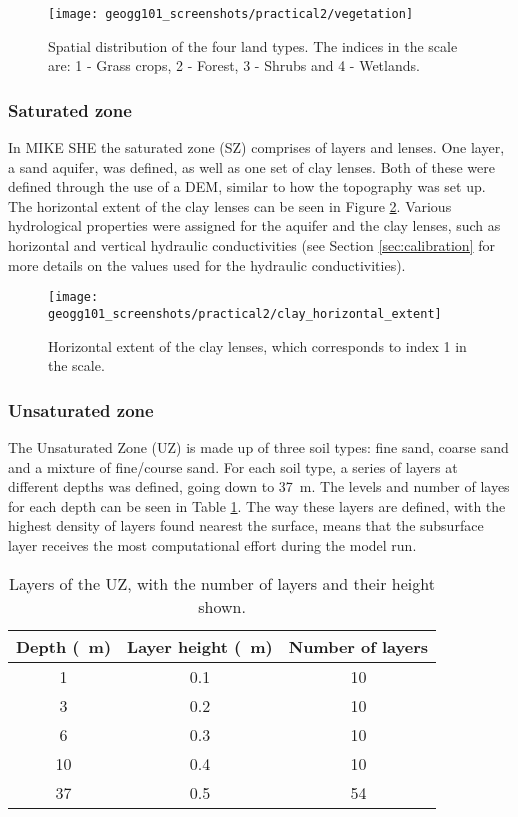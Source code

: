 \documentclass{article}
\begin{document}
\begin{figure}[!h]
    \centering
    \texttt{[image: geogg101\_screenshots/practical2/vegetation]}
    \caption{Spatial distribution of the four land types. The indices in the scale are: 1 - Grass crops, 2 - Forest, 3 - Shrubs and 4 - Wetlands. }
    \label{fig:vegetation}
\end{figure}


\subsubsection{Saturated zone}

In MIKE SHE the saturated zone (SZ) comprises of layers and lenses. One layer, a sand aquifer, was defined, as well as one set of clay lenses. Both of these were defined through the use of a DEM, similar to how the topography was set up. The horizontal extent of the clay lenses can be seen in Figure \ref{fig:clay_horizontal_extent}. Various hydrological properties were assigned for the aquifer and the clay lenses, such as horizontal and vertical hydraulic conductivities (see Section \ref{sec:calibration} for more details on the values used for the hydraulic conductivities).

\begin{figure}[!h]
    \centering
    \texttt{[image: geogg101\_screenshots/practical2/clay\_horizontal\_extent]}
    \caption{Horizontal extent of the clay lenses, which corresponds to index 1 in the scale.}
    \label{fig:clay_horizontal_extent}
\end{figure}

\subsubsection{Unsaturated zone}

The Unsaturated Zone (UZ) is made up of three soil types: fine sand, coarse sand and a mixture of fine/course sand. For each soil type, a series of layers at different depths was defined, going down to \SI{37}{m}. The levels and number of layes for each depth can be seen in Table \ref{table:uz_depths}. The way these layers are defined, with the highest density of layers found nearest the surface, means that the subsurface layer receives the most computational effort during the model run.

\setlength\extrarowheight{3pt}
\begin{table}[!h]
    \centering
    \begin{tabular}{c c c}
	Depth (\SI{}{m})  & Layer height (\SI{}{m}) & Number of layers \\
	    \hline
	    1 & 0.1 & 10 \\
	    3 & 0.2 & 10 \\
	    6 & 0.3 & 10 \\
	    10 & 0.4 & 10 \\
	    37 & 0.5 & 54 \\
    \end{tabular}
    \caption{Layers of the UZ, with the number of layers and their height shown.}
    \label{table:uz_depths}
\end{table}
\end{document}
